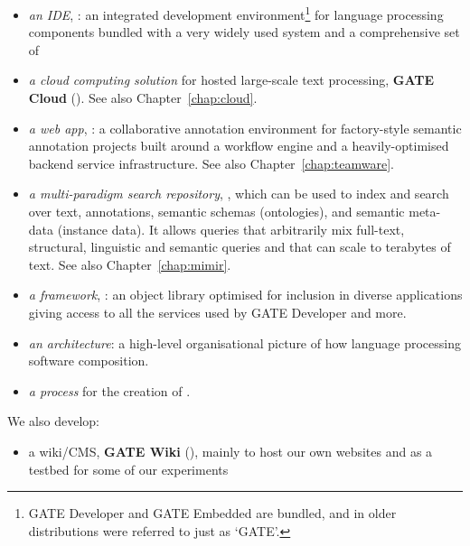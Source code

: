 \begin{itemize}
\item
\textit{an IDE}, \textbf{}: 
  an integrated development environment\footnote{GATE
  Developer and GATE Embedded are bundled, and in older distributions were
  referred to just as `GATE'.} for
  language processing components bundled with a very widely used  system and a comprehensive set of
\item
\textit{a cloud computing solution} for hosted large-scale text
  processing, \textbf{GATE Cloud}
  (). See also Chapter~\ref{chap:cloud}.
\item
\textit{a web app}, : a collaborative
  annotation environment for factory-style semantic annotation projects built
  around a workflow engine and a heavily-optimised backend service
  infrastructure. See also Chapter~\ref{chap:teamware}.
\item 
\textit{a multi-paradigm search repository}, ,
 which can be used to index and search over text, annotations, semantic schemas
(ontologies), and semantic meta-data (instance data). It allows queries that
arbitrarily mix full-text, structural, linguistic and semantic queries and that
can scale to terabytes of text. See also Chapter~\ref{chap:mimir}.
\item
\textit{a framework}, : an object library
  optimised for inclusion in diverse applications giving access to all the
  services used by GATE Developer and more.
\item
\textit{an architecture}: a high-level organisational picture of how language
  processing software composition.
\item
\textit{a process} for the creation of .
\end{itemize}

We also develop:

\begin{itemize}
\item
a wiki/CMS, \textbf{GATE Wiki}
  (), mainly
  to host our own websites and as a testbed for some of our
  experiments
\end{itemize}

